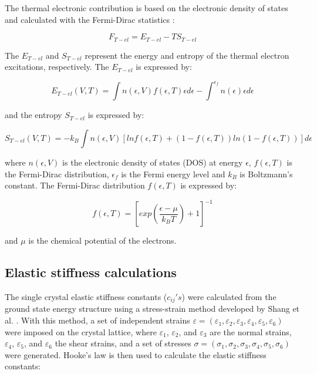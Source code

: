 The thermal electronic contribution is based on the electronic density of states and calculated with the Fermi-Dirac statistics \cite{Shang2010,Wang2004}:

\begin{equation}
\label{eq:thermalelectronic}
F_{T-el} = E_{T-el} - T S_{T-el}
\end{equation}

\noindent The $E_{T-el}$ and $S_{T-el}$ represent the energy and entropy of the thermal electron excitations, respectively. The $E_{T-el}$ is expressed by:

\begin{equation}
\label{eq:etel}
E_{T-el} (V,T) = \int n\left(\epsilon, V\right) f \left(\epsilon, T\right) \epsilon d \epsilon - \int^{\epsilon_{f}} n (\epsilon) \epsilon d \epsilon
\end{equation}

\noindent and the entropy $S_{T-el}$ is expressed by:

\begin{equation}
\label{eq:sel}
S_{T-el} (V,T) = -k_{B} \int n(\epsilon, V) \left[ ln f \left(\epsilon,T\right) + \left( 1 - f(\epsilon, T) \right) ln \left( 1 - f \left(\epsilon, T \right) \right) \right] d\epsilon 
\end{equation}

\noindent where $n(\epsilon, V)$ is the electronic density of states (DOS) at energy $\epsilon$,  $f (\epsilon,T)$ is the Fermi-Dirac distribution, $\epsilon_{f}$ is the Fermi energy level and $k_{B}$ is Boltzmann's constant. The Fermi-Dirac distribution $f (\epsilon, T)$ is expressed by:

\begin{equation}
\label{eq:fermidirac}
f (\epsilon,T) = \left[ exp \left( \frac{\epsilon - \mu}{k_{B} T} \right) + 1 \right]^{-1}
\end{equation}

\noindent and $\mu$ is the chemical potential of the electrons. 


\subsection{Elastic stiffness calculations}

The single crystal elastic stiffness constants ($c_{ij}$$'s$) were calculated from the ground state energy structure using a stress-strain method developed by Shang et al. \cite{Shang2007c}. With this method, a set of independent strains $\varepsilon = (\varepsilon_{1}, \varepsilon_{2}, \varepsilon_{3}, \varepsilon_{4}, \varepsilon_{5}, \varepsilon_{6})$ were imposed on the crystal lattice, where $\varepsilon_{1}$, $\varepsilon_{2}$, and $\varepsilon_{3}$ are the normal strains, $\varepsilon_{4}$, $\varepsilon_{5}$, and $\varepsilon_{6}$ the shear strains, and a set of stresses $\sigma = (\sigma_{1}, \sigma_{2}, \sigma_{3}, \sigma_{4}, \sigma_{5},\sigma_{6})$ were generated. Hooke's law is then used to calculate the elastic stiffness constants: 

